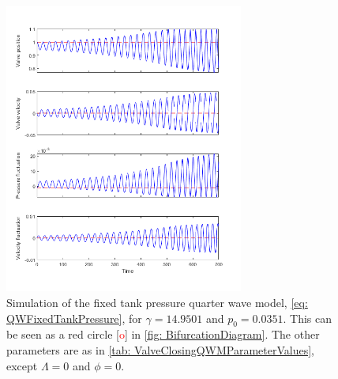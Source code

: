 \begin{figure}[!ht]
    \centering
    \includegraphics[width=0.7\textwidth]{Figures/QWMSimulation/SustOscilWithImpact/CombinedFigure.png}
    \caption{Simulation of the fixed tank pressure quarter wave model, \cref{eq: QWFixedTankPressure}, for $\gamma = 14.9501$ and $p_0 = 0.0351$. This can be seen as a red circle [\textcolor{Red}{o}] in \cref{fig: BifurcationDiagram}. The other parameters are as in \cref{tab: ValveClosingQWMParameterValues}, except $\Lambda=0$ and $\phi=0$.}
    \label{fig: QWSustOsc}
\end{figure}